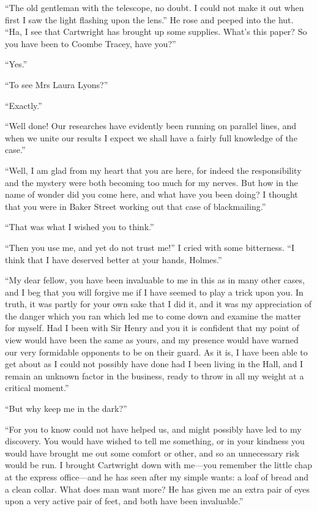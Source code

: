 \documentclass[paper=a5,BCOR=7mm,twoside,DIV=calc,12pt,usegeometry,openany,chapterprefix,endperiod,headings=big]{scrbook} %
\begin{document}
\enquote{The old gentleman with the telescope, no doubt. I could not make it out when first I saw the light flashing upon the lens.} He rose and peeped into the hut. \enquote{Ha, I see that Cartwright has brought up some supplies. What's this paper? So you have been to Coombe Tracey, have you?}

\enquote{Yes.}

\enquote{To see Mrs Laura Lyons?}

\enquote{Exactly.}

\enquote{Well done! Our researches have evidently been running on parallel lines, and when we unite our results I expect we shall have a fairly full knowledge of the case.}

\enquote{Well, I am glad from my heart that you are here, for indeed the responsibility and the mystery were both becoming too much for my nerves. But how in the name of wonder did you come here, and what have you been doing? I thought that you were in Baker Street working out that case of blackmailing.}

\enquote{That was what I wished you to think.}

\enquote{Then you use me, and yet do not trust me!} I cried with some bitterness. \enquote{I think that I have deserved better at your hands, \newline Holmes.}

\enquote{My dear fellow, you have been invaluable to me in this as in many other cases, and I beg that you will forgive me if I have seemed to play a trick upon you. In truth, it was partly for your own sake that I did it, and it was my appreciation of the danger which you ran which led me to come down and examine the matter for myself. Had I been with Sir Henry and you it is confident that my point of view would have been the same as yours, and my presence would have warned our very formidable opponents to be on their guard. As it is, I have been able to get about as I could not possibly have done had I been living in the Hall, and I remain an unknown factor in the business, ready to throw in all my weight at a critical moment.}

\enquote{But why keep me in the dark?}

\enquote{For you to know could not have helped us, and might possibly have led to my discovery. You would have wished to tell me something, or in your kindness you would have brought me out some comfort or other, and so an unnecessary risk would be run. I brought Cartwright down with me---you remember the little chap at the express office---and he has seen after my simple wants: a loaf of bread and a clean collar. What does man want more? He has given me an extra pair of eyes upon a very active pair of feet, and both have been invaluable.}
\end{document}
